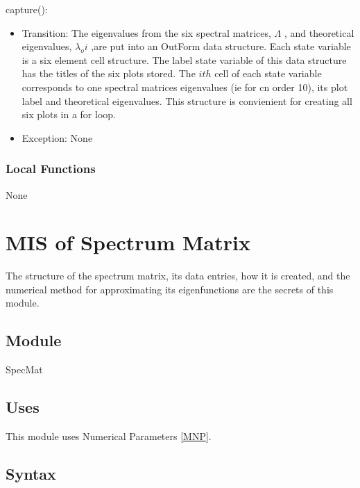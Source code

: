 \documentclass[12pt, titlepage]{article}
\begin{document}
\noindent capture():
\begin{itemize}
	\item Transition: The eigenvalues from the six spectral matrices, $\Lambda$ 
	,
	and theoretical eigenvalues, $\lambda_{o}i$ ,are put into an OutForm data 
	structure. Each state variable is a six element cell structure. The label 
	state variable of this data structure has the titles of the six plots 
	stored. The $ith$ cell of each state variable corresponds to one spectral 
	matrices eigenvalues (ie for cn order 10), its plot label and theoretical 
	eigenvalues. This structure is convienient for creating all six plots in a 
	for loop. 
	\item Exception: None
\end{itemize}  

\subsubsection{Local Functions}

None

\newpage
\section{MIS of Spectrum Matrix} \label{SSM}

The structure of the spectrum matrix, its data entries, how 
it is created, and the numerical method for approximating its 
eigenfunctions are the secrets of this module.  

\subsection{Module}

SpecMat

\subsection{Uses}

This module uses Numerical Parameters \ref{MNP}. 

\subsection{Syntax}
\end{document}
